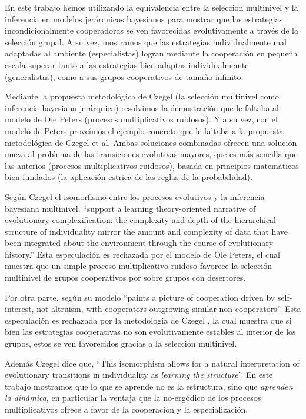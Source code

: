 \documentclass[a4paper,10pt]{article}
\begin{document}
En este trabajo hemos utilizando la equivalencia entre la selección multinivel y la inferencia en modelos jerárquicos bayesianos para mostrar que las estrategias incondicionalmente cooperadoras se ven favorecidas evolutivamente a través de la selección grupal.
A su vez, mostramos que las estrategias individualmente mal adaptadas al ambiente (especialistas) logran mediante la cooperación en pequeña escala superar tanto a las estrategias bien adaptas individualmemte (generalistas), como a sus grupos cooperativos de tamaño infinito.

Mediante la propuesta metodológica de Czegel \cite{czegel2019-bayesianEvolution} (la selección multinivel como inferencia bayesiana jerárquica) resolvimos la demostración que le faltaba al modelo de Ole Peters (procesos multiplicativos ruidosos).
Y a su vez, con el modelo de Peters proveímos el ejemplo concreto que le faltaba a la propuesta metodológica de Czegel et al.
Ambas soluciones combinadas ofrecen una solución nueva al problema de las transiciones evolutivas mayores, que es más sencilla que las anterios (procesos multiplicativos ruidosos), basada en principios matemáticos bien fundados (la aplicación estrica de las reglas de la probabilidad).

Según Czegel \cite{czegel2019-bayesianEvolution} el isomorfismo entre los procesos evolutivos y la inferencia bayesiana multinivel,  ``support a learning theory-oriented narrative of evolutionary complexification: the complexity and depth of the hierarchical structure of individuality mirror the amount and complexity of data that have been integrated about the environment through the course of evolutionary history.''
Esta especulación es rechazada por el modelo de Ole Peters, el cual muestra que un simple proceso multiplicativo ruidoso favorece la selección multinivel de grupos cooperativos por sobre grupos con desertores.

Por otra parte, según \cite{peters-cooperation2019.03.04} su modelo ``paints a picture of cooperation driven by self-interest, not altruism, with cooperators outgrowing similar non-cooperators''.
Esta especulación es rechazada por la metodología de Czegel \cite{czegel2019-bayesianEvolution}, la cual muestra que si bien las estrategias cooperativas no son evolutivamente estables al interior de los grupos, estos se ven favorecidos gracias a la selección multinivel.

Además Czegel \cite{czegel2019-bayesianEvolution} dice que, ``This isomorphism allows for a natural interpretation of evolutionary transitions in individuality as \emph{learning the structure}''.
En este trabajo mostramos que lo que se aprende no es la estructura, sino que \emph{aprenden la dinámica}, en particular la ventaja que la no-ergódico de los procesos multiplicativos ofrece a favor de la cooperación y la especialización.
\end{document}
